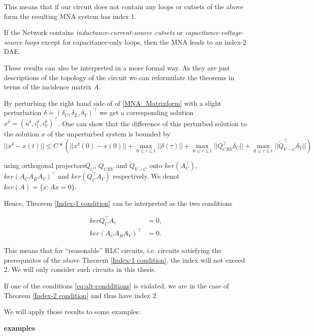 This means that if our circuit does not contain any loops or cutsets of the above form the resulting MNA system has index 1.

\begin{theorem} \label{Index-2 condition}
	If the Network contains \emph{inductance-current-source cutsets} or \emph{capacitance-voltage-source loops} except for capacitance-only loops, then the MNA leads to an index-2 DAE.
\end{theorem}

These results can also be interpreted in a more formal way. As they are just descriptions of the topology of the circuit we can reformulate the theorems in terms of the incidence matrix $A$.

By perturbing the right hand side of of \eqref{MNA_Matrixform} with a slight perturbation $\delta = (\delta_C, \delta_L, \delta_V)^\top$ we get a corresponding solution $x^\delta = (u^\delta, i_l^\delta, i_V^\delta)^\top$. One can show that the difference of this perturbed solution to the solution $x$ of the unperturbed system is bounded by
\begin{displaymath}
	|| x^\delta - x(t) || \leq C * \left( ||x^\delta (0) - x(0)|| + \max_{0 \leq \tau \leq t} ||\delta(\tau)|| + \max_{0 \leq \tau \leq t} ||Q_{CRV}^\top \dot{\delta_C}|| + \max_{0 \leq \tau \leq t} ||\tilde{Q}_{V-C}^\top \dot{\delta_V}|| \right)
\end{displaymath}

using orthogonal projectors$Q_C$, $Q_{CRV}$ and $\tilde{Q}_{V-C}$  onto $ker(A_C^\top)$, $ker(A_CA_RA_V)^\top$ and $ker(Q_C^\top A_V)$ respectively. We denot $ker(A) = \{x: Ax = 0\}$.

Hence, Theorem \ref{Index-1 condition} can be interpreted as the two conditions

\begin{equation}
	\label{eq:alt-condditions}
	\begin{aligned}
		kerQ_C^\top A_v &= {0}, \\
		ker(A_C A_R A_V)^\top &= {0}.
	\end{aligned}
\end{equation}
	

This means that for ``reasonable'' RLC circuits, i.e. circuits satisfying the prerequisites of the above Theorem \ref{Index-1 condition}, the index will not exceed 2. We will only consider such circuits in this thesis.

If one of the conditions \eqref{eq:alt-condditions} is violated, we are in the case of Theorem \ref{Index-2 condition} and thus have index 2.

We will apply those results to some examples: %

\textbf{examples}